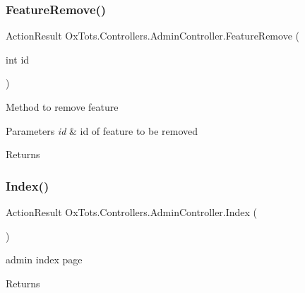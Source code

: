 \subsubsection{\texorpdfstring{FeatureRemove()}{FeatureRemove()}}
{\footnotesize\ttfamily Action\+Result Ox\+Tots.\+Controllers.\+Admin\+Controller.\+Feature\+Remove (\begin{DoxyParamCaption}\item[{int}]{id }\end{DoxyParamCaption})\hspace{0.3cm}{\ttfamily [inline]}}



Method to remove feature 


\begin{DoxyParams}{Parameters}
{\em id} & id of feature to be removed\\
\hline
\end{DoxyParams}
\begin{DoxyReturn}{Returns}

\end{DoxyReturn}
\mbox{\label{class_ox_tots_1_1_controllers_1_1_admin_controller_a54c0e90ba396562dcafac0839bdb4b61}} 
\subsubsection{\texorpdfstring{Index()}{Index()}}
{\footnotesize\ttfamily Action\+Result Ox\+Tots.\+Controllers.\+Admin\+Controller.\+Index (\begin{DoxyParamCaption}{ }\end{DoxyParamCaption})\hspace{0.3cm}{\ttfamily [inline]}}



admin index page 

\begin{DoxyReturn}{Returns}

\end{DoxyReturn}
\mbox{\label{class_ox_tots_1_1_controllers_1_1_admin_controller_aca6680a839cb3258b6c48608085b9346}} 
